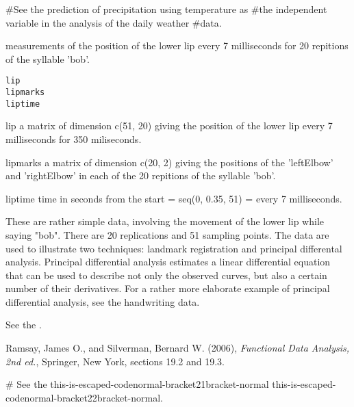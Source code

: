 \documentclass{article}
\begin{document}
\begin{SeeAlso}\relax
{}
\end{SeeAlso}
\begin{Examples}
\begin{ExampleCode}
#See the prediction of precipitation using temperature as
#the independent variable in the analysis of the daily weather
#data.
\end{ExampleCode}
\end{Examples}

\begin{Description} measurements of the position of the lower lip every 7 milliseconds
for 20 repitions of the syllable 'bob'.
\end{Description}
\begin{Usage}
\begin{verbatim}
lip
lipmarks 
liptime
\end{verbatim}
\end{Usage}
\begin{Format}\relax
\item[lip] a matrix of dimension c(51, 20) giving the position of the lower
lip every 7 milliseconds for 350 miliseconds.

\item[lipmarks] a matrix of dimension c(20, 2) giving the positions of the
'leftElbow' and 'rightElbow' in each of the 20 repitions of the
syllable 'bob'.  

\item[liptime] time in seconds from the start = seq(0, 0.35, 51) = every 7
milliseconds.  
\end{Format}
\begin{Details}\relax
These are rather simple data, involving the movement of the lower lip
while saying "bob".  There are 20 replications and 51 sampling points.
The data are used to illustrate two techniques:  landmark registration
and principal differental analysis.  
Principal differential analysis estimates a linear differential equation
that can be used to describe not only the observed curves, but also a 
certain number of their derivatives.  
For a rather more elaborate example of principal differential analysis, 
see the handwriting data.

See the  .
\end{Details}
\begin{Source}\relax
Ramsay, James O., and Silverman, Bernard W. (2006), \emph{Functional
Data Analysis, 2nd ed.}, Springer, New York, sections 19.2 and
19.3.
\end{Source}
\begin{Examples}
\begin{ExampleCode}
#  See the this-is-escaped-codenormal-bracket21bracket-normal this-is-escaped-codenormal-bracket22bracket-normal.  
\end{ExampleCode}
\end{Examples}
\end{document}
